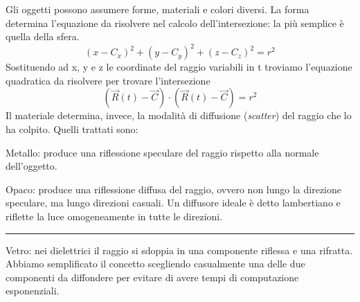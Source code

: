 \documentclass[main.tex]{subfiles}
\begin{document}
Gli oggetti possono assumere forme, materiali e colori diversi.
La forma determina l'equazione da risolvere nel calcolo dell'intersezione: la più semplice è quella della sfera. 
\[
(x - C_x)^2 + (y - C_y)^2 + (z - C_z)^2 = r^2
\]
Sostituendo ad x, y e z le coordinate del raggio variabili in t troviamo l'equazione quadratica da risolvere per trovare l'intersezione 
\[
(\Vec{R}(t) - \Vec{C}) \cdot (\Vec{R}(t) - \Vec{C}) = r^2
\]
Il materiale determina, invece, la modalità di diffusione (\textit{scatter}) del raggio che lo ha colpito. Quelli trattati sono:
\begin{itemize}
    \begin{minipage}{0.54\textwidth}
        \item Metallo: produce una riflessione speculare del raggio rispetto alla normale dell'oggetto. 
        \item Opaco: produce una riflessione diffusa del raggio, ovvero non lungo la direzione speculare, ma lungo direzioni casuali. Un diffusore ideale è detto lambertiano e riflette la luce omogeneamente in tutte le direzioni. 
        \end{minipage}%
    \begin{minipage}{0.4\textwidth}
        \centering
        \captionsetup{aboveskip=0pt}
        \vspace{-14pt}\rule{0.65\linewidth}{0.4pt}
    \end{minipage}
    \item Vetro: nei dielettrici il raggio si sdoppia in una componente riflessa e una rifratta. Abbiamo semplificato il concetto scegliendo casualmente una delle due componenti da diffondere per evitare di avere tempi di computazione esponenziali. 
\end{itemize}
\end{document}
